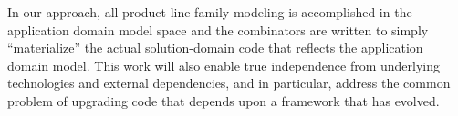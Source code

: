 In our approach, all product line family modeling is accomplished in the application domain model space and the
 combinators are written to simply “materialize” the actual solution-domain code that reflects the application
 domain model. This work will also enable true independence from underlying technologies and external
 dependencies, and in particular, address the common problem of upgrading code that depends upon a framework
 that has evolved.